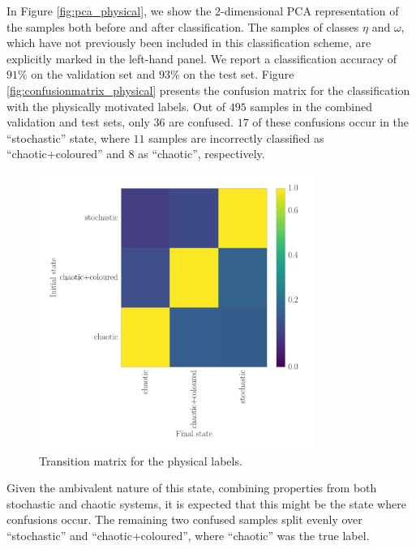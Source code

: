 \documentclass[fleqn,usenatbib]{mnras}
\begin{document}
In Figure \ref{fig:pca_physical}, we show the 2-dimensional PCA representation of the samples both before and after classification. The samples of classes $\eta$ and $\omega$, which have not previously been included in this classification scheme, are explicitly marked in the left-hand panel. 
We report a classification accuracy of $91\%$ on the validation set and $93\%$ on the test set. Figure \ref{fig:confusionmatrix_physical} presents the confusion matrix for the classification with the physically motivated labels.
Out of $495$ samples in the combined validation and test sets, only $36$ are confused. $17$ of these confusions occur in the ``stochastic'' state, where $11$ samples are incorrectly 
classified as ``chaotic+coloured'' and $8$ as ``chaotic'', respectively. 
\begin{figure}
\begin{center}
\includegraphics[width=9cm]{grs1915_supervised_phys_transmat.pdf}
\caption{Transition matrix for the physical labels.} 
\label{fig:transmat_phys}
\end{center}
\end{figure}
Given the ambivalent nature of this state, combining properties from both stochastic and chaotic systems, it is expected that this might be the state where confusions occur. The remaining two confused samples split evenly over ``stochastic'' and ``chaotic+coloured'', where ``chaotic'' was the true label.
\end{document}
